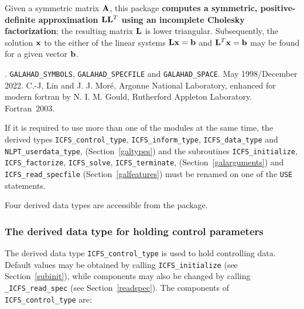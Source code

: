 \documentclass{galahad}
\newcommand{\packagename}{ICFS}
\newcommand{\fullpackagename}{\libraryname\_\packagename}
\begin{document}
\galheader


\galsummary
Given a symmetric matrix ${\mathbf{A}}$, this package
{\bf computes a symmetric, positive-definite approximation
${\mathbf{L}} {\mathbf{L}}^T$ using an incomplete Cholesky factorization}; the
resulting matrix ${\mathbf{L}}$ is lower triangular.
Subsequently, the solution ${\mathbf{x}}$ to the either of the linear systems
${\mathbf{L}} {\mathbf{x}} = {\mathbf{b}}$ and ${\mathbf{L}}^T {\mathbf{x}} = {\mathbf{b}}$
may be found for a given vector ${\mathbf{b}}$.


\galattributes
\galversions{\tt  \fullpackagename\_single, \fullpackagename\_double}.
\galuses
{\tt GALAHAD\_SY\-M\-BOLS},
{\tt GALAH\-AD\-\_\-SP\-ECFILE} and
{\tt GALAHAD\_SPACE}.
\galdate May 1998/December 2022.
\galorigin C.-J, Lin and J. J. Mor\'{e}, Argonne National Laboratory,
enhanced for modern fortran by N. I. M. Gould, Rutherford Appleton Laboratory.
\gallanguage Fortran~2003.


\galhowto



\noindent
If it is required to use more than one of the modules at the same time, 
the derived types
{\tt \packagename\_control\_type},
{\tt \packagename\_inform\_type},
{\tt \packagename\_data\_type}
and
{\tt NLPT\_userdata\_type},
(Section~\ref{galtypes})
and the subroutines
{\tt \packagename\_initialize},
{\tt \packagename\_\-factorize},
{\tt \packagename\_\-solve},
{\tt \packagename\_terminate},
(Section~\ref{galarguments})
and
{\tt \packagename\_read\_specfile}
(Section~\ref{galfeatures})
must be renamed on one of the {\tt USE} statements.





\galtypes
Four derived data types are accessible from the package.


\subsubsection{The derived data type for holding control
 parameters}\label{typecontrol}
The derived data type
{\tt \packagename\_control\_type}
is used to hold controlling data. Default values may be obtained by calling
{\tt \packagename\_initialize}
(see Section~\ref{subinit}),
while components may also be changed by calling
{\tt \fullpackagename\_read\-\_spec}
(see Section~\ref{readspec}).
The components of
{\tt \packagename\_control\_type}
are:
\end{document}
